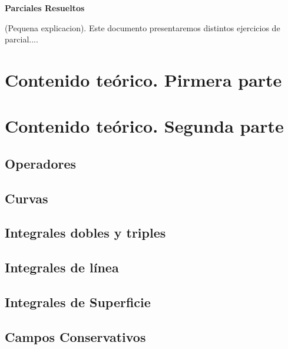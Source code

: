 \documentclass[10pt, a4paper]{report}
\theoremstyle{definition} %
\begin{document}
    \newpage

    \setcounter{page}{1}
    \begin{center}
        \textbf{ \noindent \textbf{Parciales Resueltos}}
    \end{center}
    \vspace{3cm}
      
    (Pequena explicacion).  Este documento presentaremos distintos ejercicios de parcial....
    \newpage

    \tableofcontents
        \setcounter{page}{1}

    \chapter{Contenido teórico. Pirmera parte}

    \chapter{Contenido teórico. Segunda parte}
        \section{Operadores}
            
        \section{Curvas}
            
        \section{Integrales dobles y triples}
        \section{Integrales de l\'inea}
            
        \section{Integrales de Superficie}
        \section{Campos Conservativos}
            
\end{document}
